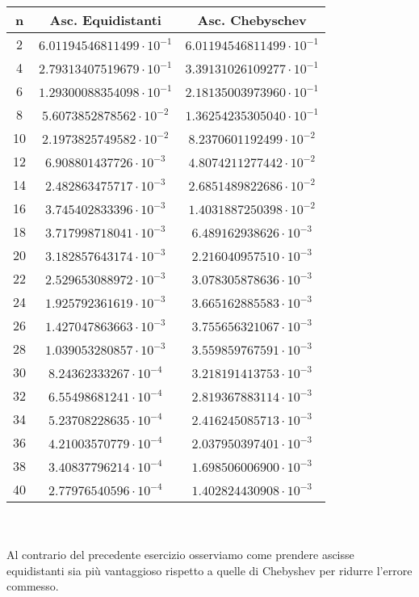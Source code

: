 \documentclass[a4paper]{report}
\begin{document}
\begin{tabular}{|c|c|c|}	%
	\hline
	n&Asc. Equidistanti&Asc. Chebyschev\\ \hline
	 2&$ 6.01194546811499 \cdot 10^{-1}   $&$ 6.01194546811499 \cdot 10^{-1} $\\ \hline
4&$ 2.79313407519679 \cdot 10^{-1}   $&$ 3.39131026109277 \cdot 10^{-1} $\\ \hline
6&$ 1.29300088354098 \cdot 10^{-1}   $&$ 2.18135003973960 \cdot 10^{-1} $\\ \hline
8&$ 5.6073852878562 \cdot 10^{-2}    $&$ 1.36254235305040 \cdot 10^{-1} $\\ \hline
10&$ 2.1973825749582 \cdot 10^{-2}    $&$ 8.2370601192499 \cdot 10^{-2} $\\ \hline
12&$ 6.908801437726 \cdot 10^{-3} $&$ 4.8074211277442 \cdot 10^{-2} $\\ \hline
14&$ 2.482863475717 \cdot 10^{-3} $&$ 2.6851489822686 \cdot 10^{-2} $\\ \hline
16&$ 3.745402833396 \cdot 10^{-3} $&$ 1.4031887250398 \cdot 10^{-2} $\\ \hline
18&$ 3.717998718041 \cdot 10^{-3} $&$ 6.489162938626 \cdot 10^{-3} $\\ \hline
20&$ 3.182857643174 \cdot 10^{-3} $&$ 2.216040957510 \cdot 10^{-3} $\\ \hline
22&$ 2.529653088972 \cdot 10^{-3} $&$ 3.078305878636 \cdot 10^{-3} $\\ \hline
24&$ 1.925792361619 \cdot 10^{-3} $&$ 3.665162885583 \cdot 10^{-3} $\\ \hline
26&$ 1.427047863663 \cdot 10^{-3} $&$ 3.755656321067 \cdot 10^{-3} $\\ \hline
28&$ 1.039053280857 \cdot 10^{-3} $&$ 3.559859767591 \cdot 10^{-3} $\\ \hline
30&$ 8.24362333267 \cdot 10^{-4} $&$ 3.218191413753 \cdot 10^{-3} $\\ \hline
32&$ 6.55498681241 \cdot 10^{-4} $&$ 2.819367883114 \cdot 10^{-3} $\\ \hline
34&$ 5.23708228635 \cdot 10^{-4} $&$ 2.416245085713 \cdot 10^{-3} $\\ \hline
36&$ 4.21003570779 \cdot 10^{-4} $&$ 2.037950397401 \cdot 10^{-3} $\\ \hline
38&$ 3.40837796214 \cdot 10^{-4} $&$ 1.698506006900 \cdot 10^{-3} $\\ \hline
40&$ 2.77976540596 \cdot 10^{-4} $&$ 1.402824430908 \cdot 10^{-3} $\\ \hline
\end{tabular}
\\ \\ Al contrario del precedente esercizio osserviamo come prendere ascisse equidistanti sia più vantaggioso rispetto a quelle di Chebyshev per ridurre l'errore commesso.
\\
\end{document}
